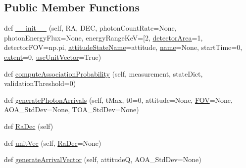 \subsection*{Public Member Functions}
\begin{DoxyCompactItemize}
\item 
def \hyperlink{classmodest_1_1signals_1_1staticxraypointsource_1_1StaticXRayPointSource_af3ce1c6b52a940dbbd0e5ac47152bbf4}{\+\_\+\+\_\+init\+\_\+\+\_\+} (self, RA, D\+EC, photon\+Count\+Rate=None, photon\+Energy\+Flux=None, energy\+Range\+KeV=\mbox{[}2, \hyperlink{classmodest_1_1signals_1_1staticxraypointsource_1_1StaticXRayPointSource_a3229134704add2350e5090b2337583f9}{detector\+Area}=1, detector\+F\+OV=np.\+pi, \hyperlink{classmodest_1_1signals_1_1pointsource_1_1PointSource_a0924a2233bb4fd23e50d024e4f1b048e}{attitude\+State\+Name}=\textquotesingle{}attitude\textquotesingle{}, \hyperlink{classmodest_1_1signals_1_1staticxraypointsource_1_1StaticXRayPointSource_adf18ce1f6cf286238d5ae52bd9d3978c}{name}=None, start\+Time=0, \hyperlink{classmodest_1_1signals_1_1pointsource_1_1PointSource_a984b5a75c9e94cb3527707b9ac976f9e}{extent}=0, \hyperlink{classmodest_1_1signals_1_1pointsource_1_1PointSource_ac2dd52c4e1f7e6264c9d59a5ffbc43d1}{use\+Unit\+Vector}=True)
\item 
def \hyperlink{classmodest_1_1signals_1_1staticxraypointsource_1_1StaticXRayPointSource_a323dabf6a6c6b5f52d2667c7d7180461}{compute\+Association\+Probability} (self, measurement, state\+Dict, validation\+Threshold=0)
\item 
def \hyperlink{classmodest_1_1signals_1_1staticxraypointsource_1_1StaticXRayPointSource_a49e8ae1c44a66c1b68742a47b50fb1ed}{generate\+Photon\+Arrivals} (self, t\+Max, t0=0, attitude=None, \hyperlink{classmodest_1_1signals_1_1staticxraypointsource_1_1StaticXRayPointSource_acecc2d36638c023070193dcb64c8a554}{F\+OV}=None, A\+O\+A\+\_\+\+Std\+Dev=None, T\+O\+A\+\_\+\+Std\+Dev=None)
\item 
def \hyperlink{classmodest_1_1signals_1_1pointsource_1_1PointSource_a295eb1a487e18c77029585ac2785db80}{Ra\+Dec} (self)
\item 
def \hyperlink{classmodest_1_1signals_1_1pointsource_1_1PointSource_a133933430a784107258901e257778221}{unit\+Vec} (self, \hyperlink{classmodest_1_1signals_1_1pointsource_1_1PointSource_a295eb1a487e18c77029585ac2785db80}{Ra\+Dec}=None)
\item 
def \hyperlink{classmodest_1_1signals_1_1pointsource_1_1PointSource_abf359a17cf5bec4c51deef87c9e92cce}{generate\+Arrival\+Vector} (self, attitudeQ, A\+O\+A\+\_\+\+Std\+Dev=None)

\end{DoxyCompactItemize}
